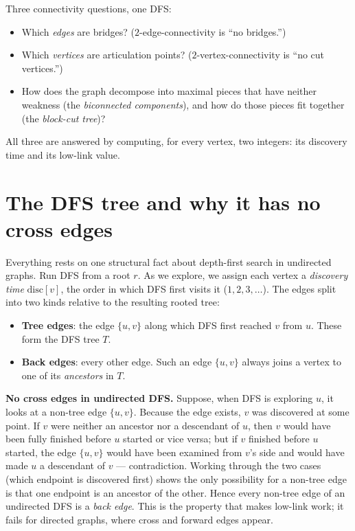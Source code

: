 \begin{focusbox}
Three connectivity questions, one DFS:
\begin{itemize}
  \item Which \emph{edges} are bridges? ($2$-edge-connectivity is ``no bridges.'')
  \item Which \emph{vertices} are articulation points? ($2$-vertex-connectivity is
        ``no cut vertices.'')
  \item How does the graph decompose into maximal pieces that have neither weakness
        (the \emph{biconnected components}), and how do those pieces fit together (the
        \emph{block-cut tree})?
\end{itemize}
All three are answered by computing, for every vertex, two integers: its discovery
time and its low-link value.
\end{focusbox}

\section{The DFS tree and why it has no cross edges}
\label{ch10:dfstree}

Everything rests on one structural fact about depth-first search in undirected graphs.
Run DFS from a root $r$. As we explore, we assign each vertex a \emph{discovery time}
$\mathrm{disc}[v]$, the order in which DFS first visits it ($1,2,3,\dots$). The edges
split into two kinds relative to the resulting rooted tree:

\begin{itemize}
  \item \textbf{Tree edges}: the edge $\{u,v\}$ along which DFS first reached $v$ from
        $u$. These form the DFS tree $T$.
  \item \textbf{Back edges}: every other edge. Such an edge $\{u,v\}$ always joins a
        vertex to one of its \emph{ancestors} in $T$.
\end{itemize}

\begin{whybox}
\textbf{No cross edges in undirected DFS.} Suppose, when DFS is exploring $u$, it looks
at a non-tree edge $\{u,v\}$. Because the edge exists, $v$ was discovered at some
point. If $v$ were neither an ancestor nor a descendant of $u$, then $v$ would have
been fully finished before $u$ started or vice versa; but if $v$ finished before $u$
started, the edge $\{u,v\}$ would have been examined from $v$'s side and would have
made $u$ a descendant of $v$ --- contradiction. Working through the two cases (which
endpoint is discovered first) shows the only possibility for a non-tree edge is that
one endpoint is an ancestor of the other. Hence every non-tree edge of an undirected
DFS is a \emph{back edge}. This is the property that makes low-link work; it fails for
directed graphs, where cross and forward edges appear.
\end{whybox}

